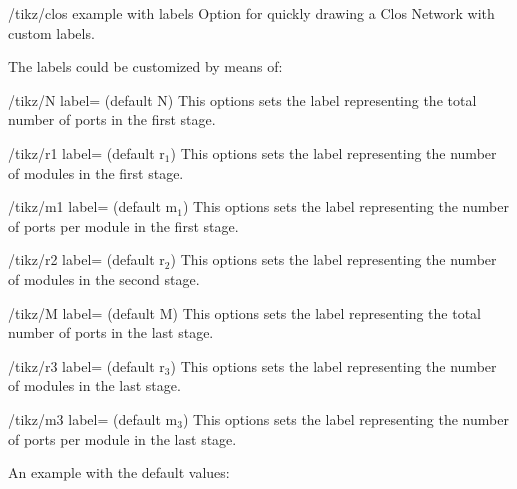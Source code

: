 \documentclass{ltxdoc} %
\begin{document}
\begin{key}{/tikz/clos example with labels}
    Option for quickly drawing a Clos Network with custom labels.
\end{key}

The labels could be customized by means of:
\begin{key}{/tikz/N label= (default N)}
    This options sets the label representing the total number of ports in the first stage.
\end{key}

\begin{key}{/tikz/r1 label= (default r$_1$)}
    This options sets the label representing the number of modules in the first stage.
\end{key}

\begin{key}{/tikz/m1 label= (default m$_1$)}
    This options sets the label representing the number of ports per module in the first stage.
\end{key}

\begin{key}{/tikz/r2 label= (default r$_2$)}
    This options sets the label representing the number of modules in the second stage.
\end{key}

\begin{key}{/tikz/M label= (default M)}
    This options sets the label representing the total number of ports in the last stage.
\end{key}

\begin{key}{/tikz/r3 label= (default r$_3$)}
    This options sets the label representing the number of modules in the last stage.
\end{key}

\begin{key}{/tikz/m3 label= (default m$_3$)}
    This options sets the label representing the number of ports per module in the last stage.
\end{key}

An example with the default values:

\begin{codeexample}[]
\end{codeexample}
\pagebreak
\end{document}
